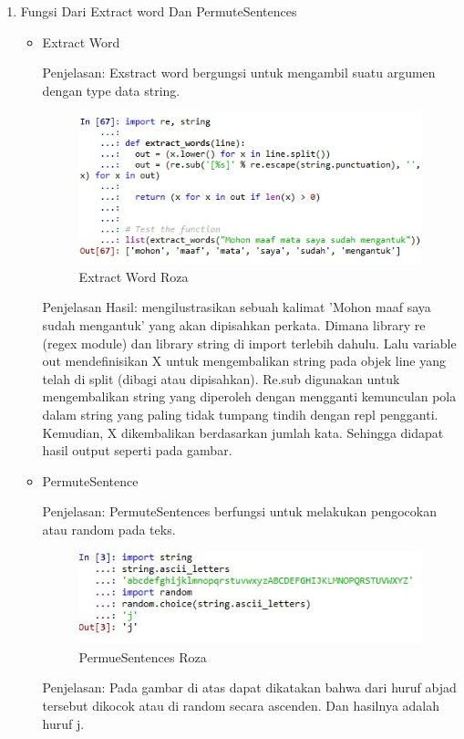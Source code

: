 \begin{enumerate}
\begin{itemize}
\end{itemize}
\item Fungsi Dari Extract word Dan PermuteSentences
\par
\begin{itemize}
\item Extract Word
\par Penjelasan: Exstract word bergungsi untuk mengambil suatu argumen dengan type data string.
\begin{figure}[!hbtp]
\centering
\includegraphics[scale=0.6]{figures/wordroza.jpeg}
\caption{Extract Word Roza}
\label{text-fadila}
\end{figure}
\par Penjelasan Hasil:  mengilustrasikan sebuah kalimat 'Mohon maaf saya sudah mengantuk' yang  akan dipisahkan perkata. Dimana library re (regex module) dan library string di import terlebih dahulu. Lalu variable out mendefinisikan X untuk mengembalikan string pada objek line yang telah di split (dibagi atau dipisahkan). Re.sub digunakan untuk mengembalikan string yang diperoleh dengan mengganti kemunculan pola dalam string yang paling tidak tumpang tindih dengan repl pengganti. Kemudian, X dikembalikan berdasarkan jumlah kata. Sehingga didapat hasil output seperti pada gambar.


\item PermuteSentence
\par Penjelasan: PermuteSentences berfungsi untuk melakukan pengocokan atau random pada teks.
\begin{figure}[!hbtp]
\centering
\includegraphics[scale=0.6]{figures/permutesenroza.jpg}
\caption{PermueSentences Roza}
\label{text-fadila}
\end{figure}
\par Penjelasan: Pada gambar di atas dapat dikatakan bahwa dari huruf abjad tersebut dikocok atau di random secara ascenden. Dan hasilnya adalah huruf j.
\end{itemize}
\end{enumerate}


